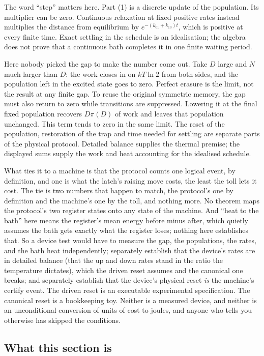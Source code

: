 \documentclass[11pt,twoside]{article}
\theoremstyle{thielethm}
\theoremstyle{thieledef}
\theoremstyle{thieledef}
\theoremstyle{thieledef}
\theoremstyle{thielethm}
\theoremstyle{thieleobs}
\theoremstyle{thielethm}
\begin{document}
The word ``step'' matters here. Part (1) is a discrete update of the population.
Its multiplier can be zero. Continuous relaxation at fixed positive rates
instead multiplies the distance from equilibrium by
$e^{-(k_{01}+k_{10})t}$, which is positive at every finite time.
Exact settling in the schedule is an idealisation; the algebra does not prove
that a continuous bath completes it in one finite waiting period.

Here nobody picked the gap to make the number come out. Take $D$ large and $N$ much larger
than $D$: the work closes in on $kT \ln 2$ from both sides, and the population left in the
excited state goes to zero. Perfect erasure is the limit, not the result at any finite gap. To reuse the
original symmetric memory, the gap must also return to zero while transitions
are suppressed. Lowering it at the final fixed population recovers
$D\pi(D)$ of work and leaves that population unchanged. This term tends to
zero in the same limit. The reset of the population, restoration of the trap
and time needed for settling are separate parts of the physical protocol.
Detailed balance supplies the thermal premise; the displayed sums supply the
work and heat accounting for the idealised schedule.

What ties it to a machine is that the protocol counts one logical event, by definition, and one is what the latch's raising move costs, the least the toll lets it cost. The tie is two numbers that happen to match, the protocol's one by definition and the machine's one by the toll, and nothing more. No theorem maps the
protocol's two register states onto any state of the machine. And ``heat to the bath'' here
means the register's mean energy before minus after, which quietly assumes the bath gets
exactly what the register loses; nothing here establishes that. So a device test would have to measure the gap, the
populations, the rates, and the bath heat independently; separately establish
that the device's rates are in detailed balance (that the up and down rates stand in the ratio the
temperature dictates), which the driven reset assumes and the canonical one breaks; and separately establish that the device's
physical reset \emph{is} the machine's certify event. The driven reset is an executable experimental
specification. The canonical reset is a bookkeeping toy. Neither is a measured device, and neither is an unconditional conversion of
units of cost to joules, and anyone who tells you otherwise has skipped the conditions.


\subsection{What this section is}
\end{document}
